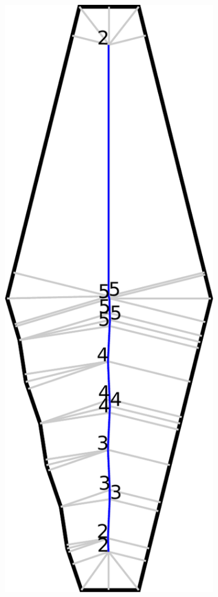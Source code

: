 \begin{figure}
\centering
\setlength{\figwidth}{0.13\textwidth}
\begin{subfigure}{\figwidth}
\includegraphics[width=\columnwidth]{sources/method/beading_transitioning_filtering__bead_count.pdf}

\end{subfigure}
\end{figure}
